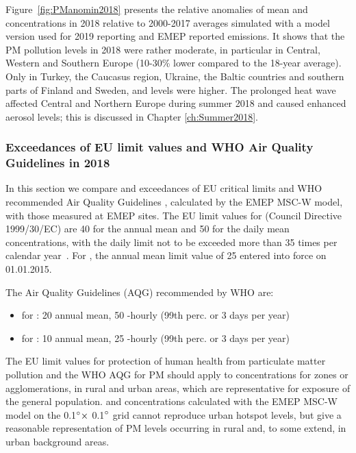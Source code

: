 
Figure~\ref{fig:PManomin2018} presents the relative anomalies of mean \PM[10] and \PM[2.5] concentrations in 2018 relative to 2000-2017 averages simulated with a model version used for 2019 reporting and EMEP reported emissions. It shows that the PM pollution levels in 2018 were rather moderate, in particular in Central, Western and Southern Europe (10-30\% lower compared to the 18-year average). Only in Turkey, the Caucasus region, Ukraine, the Baltic countries and southern parts of Finland and Sweden, \PM[10] and \PM[2.5] levels were higher. The prolonged heat wave affected Central and Northern Europe during summer 2018 and caused enhanced aerosol levels; this is discussed in Chapter \ref{ch:Summer2018}.


\subsubsection[PM exceedances]{Exceedances of EU limit values and WHO Air Quality Guidelines in 2018}
\label{subsec:PMexc}

In this section we compare \PM[10] and \PM[2.5] exceedances
of EU critical limits and WHO recommended Air Quality
Guidelines \citep{WHO:AQG}, calculated by the EMEP MSC-W model, with
those measured at EMEP sites. The EU limit values for \PM[10] (Council
Directive 1999/30/EC) are 40 \ug for the annual mean and 50 \ug for
the daily mean concentrations, with the daily limit not to be exceeded
more than 35 times per calendar year~\citep{EU2008}. For \PM[2.5], the
annual mean limit value of 25 \ug entered into force on 01.01.2015.

The Air Quality Guidelines (AQG) recommended by WHO \citep{WHO:AQG}
are:
\begin{itemize}
\item for \PM[10]: 20 \ug annual mean, 50 -hourly (99th perc. or 3 days per year)
\item for \PM[2.5]: 10 \ug annual mean, 25 -hourly (99th perc. or 3 days per year)
\end{itemize}


The EU limit values for protection of human health from particulate
matter pollution and the WHO AQG for PM should apply to concentrations
for zones or agglomerations, in rural and urban areas,
which are representative for exposure of the general
population. \PM[10] and \PM[2.5] concentrations calculated with the
EMEP MSC-W model on the 0.1$^\circ \times$ 0.1$^\circ$ grid cannot
reproduce urban hotspot levels, but give a reasonable representation
of PM levels occurring in rural and, to some extend, in urban background
areas.


